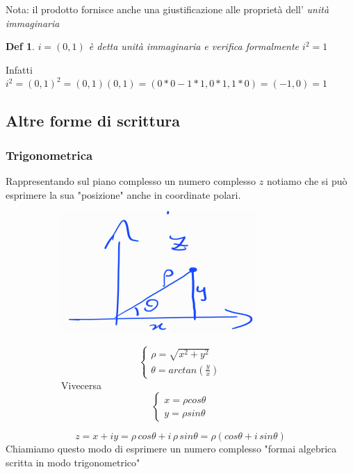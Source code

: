 \documentclass[a4paper]{article}
\newtheorem*{definition}{Def}
\begin{document}
Nota: il prodotto fornisce anche una giustificazione alle proprietà dell' \textit{unità immaginaria}
\begin{definition}
	$i=(0,1)$ è detta \textit{unità immaginaria} e verifica formalmente $i^2 =1$
\end{definition}
Infatti $i^2=(0,1)^2 = (0,1)(0,1) = (0*0 -1*1,0*1, 1 *0) = (-1,0) = 1$

\subsection{Altre forme di scrittura}
\subsubsection{Trigonometrica}
Rappresentando sul piano complesso un numero complesso $z$ notiamo che si può esprimere la sua "posizione" anche in coordinate polari.\\
\begin{figure}[H]
	\begin{subfigure}[c]{0.5\textwidth}
	\includegraphics[width=\textwidth]{forma_trig.png}
	\end{subfigure}
	\begin{subfigure}[c]{0.5\textwidth}
		\begin{equation*}
			\begin{cases}
				\rho = \sqrt{x^2 +y^2}\\
				\theta = arctan(\frac{y}{x})
			\end{cases}
		\end{equation*}
		Vivecersa
		\begin{equation*}
			\begin{cases}
				x = \rho cos \theta\\
				y = \rho sin \theta
			\end{cases}
		\end{equation*}
	\end{subfigure}
\end{figure}
$$ z=x + iy = \rho\, cos \theta + i\,\rho \, sin \theta = \rho (cos\theta + i\,sin \theta)$$
Chiamiamo questo modo di esprimere un numero complesso "formai algebrica scritta in modo trigonometrico"
\end{document}
